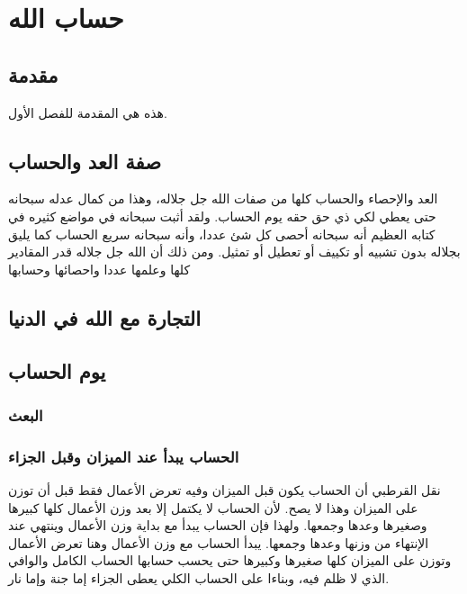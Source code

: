 \chapter{حساب الله}

\section{مقدمة}
هذه هي المقدمة للفصل الأول.



\section{صفة العد والحساب}

العد والإحصاء والحساب كلها من صفات الله جل جلاله، وهذا من كمال عدله سبحانه حتى يعطي لكي ذي حق حقه يوم الحساب. ولقد أثبت سبحانه في مواضع كثيره في كتابه العظيم أنه سبحانه أحصى كل شئ عددا، وأنه سبحانه سريع الحساب كما يليق بجلاله بدون تشبيه أو تكييف أو تعطيل أو تمثيل. ومن ذلك أن الله جل جلاله قدر المقادير كلها وعلمها عددا واحصائها وحسابها

\quranayah*[9][111]{\footnotesize \surahname*[9]}


\section{التجارة مع الله في الدنيا}

\section{يوم الحساب}


\subsection{البعث}


\subsection{الحساب يبدأ عند الميزان وقبل الجزاء}


نقل القرطبي أن الحساب يكون قبل الميزان وفيه تعرض الأعمال فقط قبل أن توزن على الميزان وهذا لا يصح. لأن الحساب لا يكتمل إلا بعد وزن الأعمال كلها كبيرها وصغيرها وعدها وجمعها. ولهذا فإن الحساب يبدأ مع بداية وزن الأعمال وينتهي عند الإنتهاء من وزنها وعدها وجمعها. يبدأ الحساب مع وزن الأعمال وهنا تعرض الأعمال وتوزن على الميزان كلها صغيرها وكبيرها حتى يحسب حسابها الحساب الكامل والوافي الذي لا ظلم فيه، وبناءا على الحساب الكلي يعطى الجزاء إما جنة وإما نار. 


